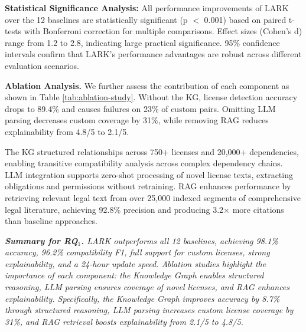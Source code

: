 \noindent\textbf{Statistical Significance Analysis:} All performance improvements of LARK over the 12 baselines are statistically significant (p $<$ 0.001) based on paired t-tests with Bonferroni correction for multiple comparisons. Effect sizes (Cohen's d) range from 1.2 to 2.8, indicating large practical significance. 95\% confidence intervals confirm that LARK's performance advantages are robust across different evaluation scenarios.

\begin{table}[ht]
\centering
\caption{Component Ablation Study Results}
\label{tab:ablation-study}
\end{table}

\noindent\textbf{Ablation Analysis.} We further assess the contribution of each component as shown in Table \ref{tab:ablation-study}. Without the KG, license detection accuracy drops to 89.4\% and causes failures on 23\% of custom pairs. Omitting LLM parsing decreases custom coverage by 31\%, while removing RAG reduces explainability from 4.8/5 to 2.1/5.

The KG structured relationships across 750+ licenses and 20,000+ dependencies, enabling transitive compatibility analysis across complex dependency chains. LLM integration supports zero-shot processing of novel license texts, extracting obligations and permissions without retraining. RAG enhances performance by retrieving relevant legal text from over 25,000 indexed segments of comprehensive legal literature, achieving 92.8\% precision and producing 3.2× more citations than baseline approaches.

\begin{boxK}
\textit{\textbf{Summary for RQ$_1$.} LARK outperforms all 12 baselines, achieving 98.1\% accuracy, 96.2\% compatibility F1, full support for custom licenses, strong explainability, and a 24-hour update speed. Ablation studies highlight the importance of each component: the Knowledge Graph enables structured reasoning, LLM parsing ensures coverage of novel licenses, and RAG enhances explainability.
Specifically, the Knowledge Graph improves accuracy by 8.7\% through structured reasoning, LLM parsing increases custom license coverage by 31\%, and RAG retrieval boosts explainability from 2.1/5 to 4.8/5.}
\end{boxK}





